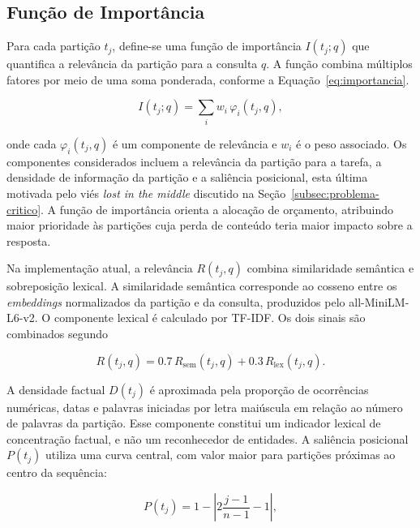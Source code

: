 \subsection{Função de Importância}
\label{subsec:importancia}

Para cada partição $t_j$, define-se uma função de importância $I(t_j; q)$ que quantifica a relevância da partição para a consulta $q$. A função combina múltiplos fatores por meio de uma soma ponderada, conforme a Equação~\ref{eq:importancia}.

\begin{equation}
\label{eq:importancia}
I(t_j; q) = \sum_{i} w_i \, \varphi_i(t_j, q),
\end{equation}

onde cada $\varphi_i(t_j, q)$ é um componente de relevância e $w_i$ é o peso associado. Os componentes considerados incluem a relevância da partição para a tarefa, a densidade de informação da partição e a saliência posicional, esta última motivada pelo viés \textit{lost in the middle} discutido na Seção~\ref{subsec:problema-critico}. A função de importância orienta a alocação de orçamento, atribuindo maior prioridade às partições cuja perda de conteúdo teria maior impacto sobre a resposta.

Na implementação atual, a relevância $R(t_j,q)$ combina similaridade semântica e sobreposição lexical. A similaridade semântica corresponde ao cosseno entre os \textit{embeddings} normalizados da partição e da consulta, produzidos pelo all-MiniLM-L6-v2. O componente lexical é calculado por TF-IDF. Os dois sinais são combinados segundo

\begin{equation}
\label{eq:relevancia-implementada}
R(t_j,q)=0.7\,R_{\mathrm{sem}}(t_j,q)+0.3\,R_{\mathrm{lex}}(t_j,q).
\end{equation}

A densidade factual $D(t_j)$ é aproximada pela proporção de ocorrências numéricas, datas e palavras iniciadas por letra maiúscula em relação ao número de palavras da partição. Esse componente constitui um indicador lexical de concentração factual, e não um reconhecedor de entidades. A saliência posicional $P(t_j)$ utiliza uma curva central, com valor maior para partições próximas ao centro da sequência:

\begin{equation}
\label{eq:saliencia-central}
P(t_j)=1-\left|2\frac{j-1}{n-1}-1\right|,
\end{equation}

